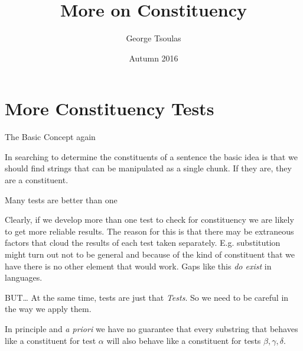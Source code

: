 

\title{More on Constituency}
\date{Autumn 2016}
\author{George Tsoulas}



\maketitle

\section{More Constituency Tests}
\begin{frame}
{The Basic Concept again}

In searching to determine the constituents of a sentence the basic idea is that we should find strings that can be manipulated as a single chunk.  If they are, they are a constituent.  

\end{frame}

\begin{frame}
  {Many tests are better than one}

Clearly, if we develop more than one test to check for constituency we are likely to get more reliable results.  The reason for this is that there may be extraneous factors that cloud the results of each test taken separately. E.g.  substitution might turn out not to be general and because of the kind of constituent that we have there is no other element that would work.  Gaps like this \textit{do exist} in languages.


\end{frame}


\begin{frame}
  {BUT\ldots}
At the same time, tests are just that \textit{Tests}.  So we need to be careful in the way we apply them. \pause

In principle and \textit{a priori} we have no guarantee that every substring that behaves like a constituent for test $\alpha$ will also behave like a constituent for tests $\beta, \gamma, \delta$. 


\end{frame}

